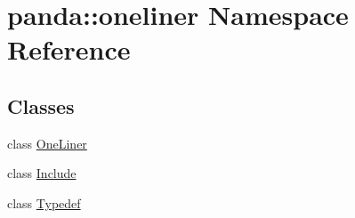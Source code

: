 \hypertarget{namespacepanda_1_1oneliner}{
\section{panda::oneliner Namespace Reference}
\label{namespacepanda_1_1oneliner}
}
\subsection*{Classes}
\begin{DoxyCompactItemize}
\item 
class \hyperlink{classpanda_1_1oneliner_1_1OneLiner}{OneLiner}
\item 
class \hyperlink{classpanda_1_1oneliner_1_1Include}{Include}
\item 
class \hyperlink{classpanda_1_1oneliner_1_1Typedef}{Typedef}
\end{DoxyCompactItemize}
